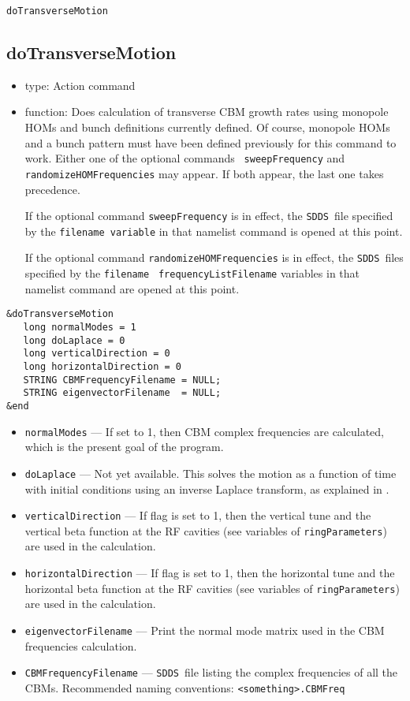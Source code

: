 \documentclass[11pt]{article}
\newcommand{\SDDS}{{\tt SDDS}}
\begin{document}
\newpage
\begin{center}{\Large\tt doTransverseMotion}\end{center}
\subsection{doTransverseMotion}

\begin{itemize}
\item type: Action command
\item function: Does calculation of transverse CBM growth rates using
monopole HOMs and bunch definitions currently defined.  Of course,
monopole HOMs and a bunch pattern must have been defined previously
for this command to work.  Either one of the optional commands {\tt
sweepFrequency} and {\tt randomizeHOMFrequencies} may appear.  If
both appear, the last one takes precedence.

If the optional command {\tt sweepFrequency} is in effect, the
\SDDS\ file specified by the {\tt filename variable} in that namelist
command is opened at this point.

If the optional command {\tt randomizeHOMFrequencies} is in effect,
the \SDDS\ files specified by the {\tt filename} {\tt
frequencyListFilename} variables in that namelist command are opened
at this point.
\end{itemize}
\begin{verbatim}
&doTransverseMotion
   long normalModes = 1
   long doLaplace = 0
   long verticalDirection = 0
   long horizontalDirection = 0
   STRING CBMFrequencyFilename = NULL;
   STRING eigenvectorFilename  = NULL;
&end
\end{verbatim}
\begin{itemize}
\item {\tt normalModes} --- If set to 1, then CBM complex frequencies
are calculated, which is the present goal of the program.
\item {\tt doLaplace} --- Not yet available. This solves the motion
as a function of time with initial conditions using an inverse Laplace
transform, as explained in \cite{Thompson:PAC89}.
\item {\tt verticalDirection} --- If flag is set to 1, then the
vertical tune and the vertical beta function at the RF cavities (see
variables of {\tt ringParameters}) are used in the calculation.
\item {\tt horizontalDirection} --- If flag is set to 1, then the
horizontal tune and the horizontal beta function at the RF cavities
(see variables of {\tt ringParameters}) are used in the calculation.
\item {\tt eigenvectorFilename} --- Print the normal
mode matrix used in the CBM frequencies calculation.
\item {\tt CBMFrequencyFilename} --- \SDDS\ file listing the
complex frequencies of all the CBMs. Recommended
naming conventions: {\tt <something>.CBMFreq}
\end{itemize}
\end{document}
